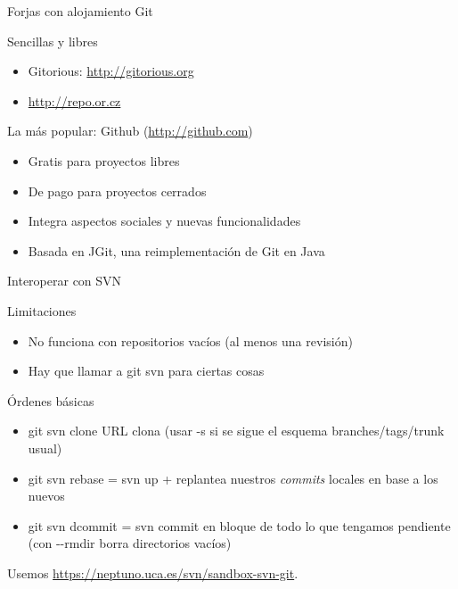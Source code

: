 \documentclass[xcolor=svgnames]{beamer}
\newcommand*{\tipo}[1]{\textit{#1}}
\newcommand*{\inlinecmd}[1]{{\small\ttfamily\nohyphens{#1}}}
\begin{document}
\begin{frame}{Forjas con alojamiento Git}

  \begin{block}{Sencillas y libres}
    \begin{itemize}
    \item Gitorious: \url{http://gitorious.org}
    \item \url{http://repo.or.cz}
    \end{itemize}
  \end{block}

  \begin{block}{La más popular: Github (\url{http://github.com})}
    \begin{itemize}
    \item Gratis para proyectos libres
    \item De pago para proyectos cerrados
    \item Integra aspectos sociales y nuevas funcionalidades
    \item Basada en JGit, una reimplementación de Git en Java
    \end{itemize}
  \end{block}

\end{frame}

\begin{frame}{Interoperar con SVN}

  \begin{block}{Limitaciones}
    \begin{itemize}
    \item No funciona con repositorios vacíos (al menos una revisión)
    \item Hay que llamar a \inlinecmd{git svn} para ciertas cosas
    \end{itemize}
  \end{block}

  \begin{block}{Órdenes básicas}
    \begin{itemize}
    \item \inlinecmd{git svn clone URL} clona (usar \inlinecmd{-s} si
      se sigue el esquema branches/tags/trunk usual)
    \item \inlinecmd{git svn rebase} = \inlinecmd{svn up} + replantea
      nuestros \tipo{commits} locales en base a los nuevos
    \item \inlinecmd{git svn dcommit} = \inlinecmd{svn commit} en
      bloque de todo lo que tengamos pendiente (con
      \inlinecmd{{-}-rmdir} borra directorios vacíos)
    \end{itemize}
  \end{block}

  Usemos \url{https://neptuno.uca.es/svn/sandbox-svn-git}.

\end{frame}
\end{document}
